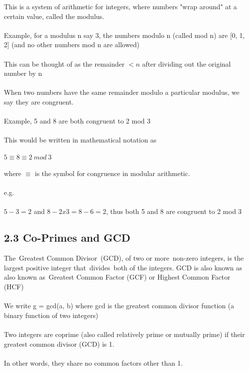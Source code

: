 \documentclass[11pt]{article}   	%
\begin{document}
This is a system of arithmetic for integers, where numbers "wrap around" at a certain value, called the modulus. \\
\\
Example, for a modulus n say 3, the numbers modulo n (called mod n) are [0, 1, 2] (and no other numbers mod n are allowed) \\
\\
This can be thought of as the remainder $ < n $ after dividing out the original number by n \\
\\
When two numbers have the same remainder modulo a particular modulus, we say they are congruent. \\
\\
Example, 5 and 8 are both congruent to 2 mod 3 \\
\\
This would be written in mathematical notation as \\
\\
$ 5 \equiv 8 \equiv 2 \ mod \ 3 $ \\
\\
where $ \equiv $ is the symbol for congruence in modular arithmetic. \\
\\
e.g. \\
\\
$ 5 - 3 = 2 $ and $ 8 - 2x3 = 8 - 6 = 2 $, thus both 5 and 8 are congruent to 2 mod 3 \\


\subsection*{2.3 Co-Primes and GCD}

The Greatest Common Divisor (GCD), of two or more non-zero integers, is the largest positive integer that divides both of the integers. GCD is also known as also known as Greatest Common Factor (GCF) or Highest Common Factor (HCF) \\
\\
We write g = gcd(a, b) where gcd is the greatest common divisor function (a binary function of two integers) \\
\\
Two integers are coprime (also called relatively prime or mutually prime) if their greatest common divisor (GCD) is 1. \\
\\
In other words, they share no common factors other than 1.
\end{document}

